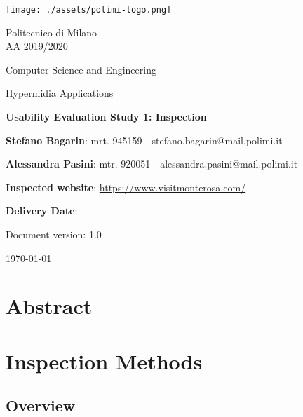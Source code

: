 \documentclass[11pt, a4paperm, hidelinks]{article}
\begin{document}
	\begin{titlepage}
		\centering
		\texttt{[image: ./assets/polimi-logo.png]}\par

		{Politecnico di Milano \\ AA 2019/2020} \par
		\vspace{1.5cm}

		{Computer Science and Engineering}\par
		\Large{Hypermidia Applications}\par
		\vspace{1.0cm}

		{\LARGE \textbf{Usability Evaluation Study 1: Inspection} \par}
		\vspace{1.5cm}

		{\normalsize {\textbf{Stefano Bagarin}: mrt. 945159 -  stefano.bagarin@mail.polimi.it }\par}
		\vspace{0.2cm}
		{\normalsize{\textbf{Alessandra Pasini}: mtr. 920051 - alessandra.pasini@mail.polimi.it}\par}
		\vspace{1.0cm}
		
		{\normalsize {\textbf{Inspected website}: \url{https://www.visitmonterosa.com/}}\par}
		\vspace{0.2cm}
		{\normalsize {\textbf{Delivery Date}: }\par}
		\vfill

		{\large Document version: 1.0\par}
		{\large \today \par}
	\end{titlepage}

	\tableofcontents
	\clearpage


	\section{Abstract}
	
	\clearpage


	\section{Inspection Methods}

	\subsection{Overview}
	
\end{document}
